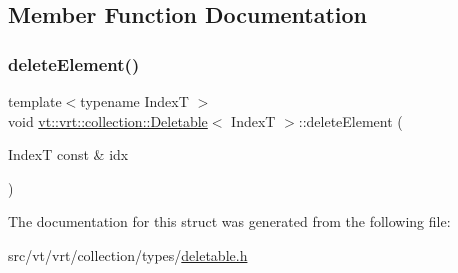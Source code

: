 \subsection{Member Function Documentation}
\mbox{\label{structvt_1_1vrt_1_1collection_1_1_deletable_a704a81052766dfc66b0c3e330a344bd5}} 
\subsubsection{\texorpdfstring{delete\+Element()}{deleteElement()}}
{\footnotesize\ttfamily template$<$typename IndexT $>$ \\
void \hyperlink{structvt_1_1vrt_1_1collection_1_1_deletable}{vt\+::vrt\+::collection\+::\+Deletable}$<$ IndexT $>$\+::delete\+Element (\begin{DoxyParamCaption}\item[{IndexT const \&}]{idx }\end{DoxyParamCaption})}



The documentation for this struct was generated from the following file\+:\begin{DoxyCompactItemize}
\item 
src/vt/vrt/collection/types/\hyperlink{deletable_8h}{deletable.\+h}\end{DoxyCompactItemize}
